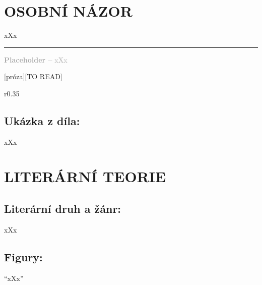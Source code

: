\documentclass{extarticle} %
\begin{document}


\section*{OSOBNÍ NÁZOR}
\noindent 
xXx

\vfill

\noindent\begin{minipage}{\textwidth}
    \textcolor{darkgray}{\rule{\linewidth}{0.4pt}
    \footnotesize
    \textbf{Placeholder --} xXx
    }
\end{minipage}

\newpage


\changefontsize{8pt}

[próza][TO READ]

\noindent\begin{wrapfigure}{r}{0.35\textwidth}
\tiny

\subsection*{Ukázka z díla:}
\setlength{\parindent}{3pt}
xXx
\end{wrapfigure}

\section*{LITERÁRNÍ TEORIE}

\subsection*{Literární druh a žánr:}
\noindent xXx



\subsection*{Figury:}
\noindent 
\enquote{xXx}
\end{document}
